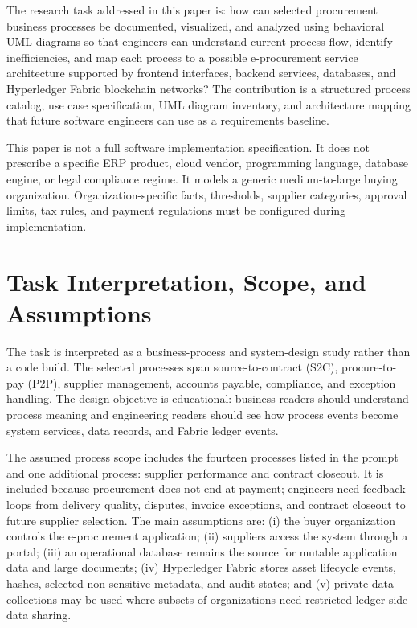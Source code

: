 \documentclass[conference]{IEEEtran}
\begin{document}
The research task addressed in this paper is: how can selected procurement business processes be documented, visualized, and analyzed using behavioral UML diagrams so that engineers can understand current process flow, identify inefficiencies, and map each process to a possible e-procurement service architecture supported by frontend interfaces, backend services, databases, and Hyperledger Fabric blockchain networks? The contribution is a structured process catalog, use case specification, UML diagram inventory, and architecture mapping that future software engineers can use as a requirements baseline.

This paper is not a full software implementation specification. It does not prescribe a specific ERP product, cloud vendor, programming language, database engine, or legal compliance regime. It models a generic medium-to-large buying organization. Organization-specific facts, thresholds, supplier categories, approval limits, tax rules, and payment regulations must be configured during implementation.

\section{Task Interpretation, Scope, and Assumptions}
The task is interpreted as a business-process and system-design study rather than a code build. The selected processes span source-to-contract (S2C), procure-to-pay (P2P), supplier management, accounts payable, compliance, and exception handling. The design objective is educational: business readers should understand process meaning and engineering readers should see how process events become system services, data records, and Fabric ledger events.

The assumed process scope includes the fourteen processes listed in the prompt and one additional process: supplier performance and contract closeout. It is included because procurement does not end at payment; engineers need feedback loops from delivery quality, disputes, invoice exceptions, and contract closeout to future supplier selection. The main assumptions are: (i) the buyer organization controls the e-procurement application; (ii) suppliers access the system through a portal; (iii) an operational database remains the source for mutable application data and large documents; (iv) Hyperledger Fabric stores asset lifecycle events, hashes, selected non-sensitive metadata, and audit states; and (v) private data collections may be used where subsets of organizations need restricted ledger-side data sharing.
\end{document}

